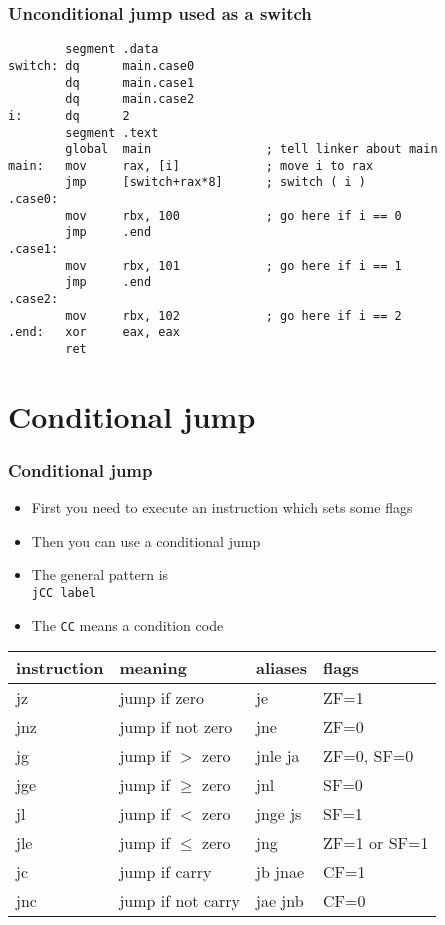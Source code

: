 \documentclass{beamer}
\begin{document}
\begin{frame}[fragile]
    \frametitle{Unconditional jump used as a switch}
\small
\begin{verbatim}
        segment .data
switch: dq      main.case0
        dq      main.case1
        dq      main.case2
i:      dq      2
        segment .text
        global  main                ; tell linker about main
main:   mov     rax, [i]            ; move i to rax
        jmp     [switch+rax*8]      ; switch ( i )
.case0:
        mov     rbx, 100            ; go here if i == 0
        jmp     .end
.case1:
        mov     rbx, 101            ; go here if i == 1
        jmp     .end     
.case2:
        mov     rbx, 102            ; go here if i == 2
.end:   xor     eax, eax
        ret
\end{verbatim}
\end{frame}

\section{Conditional jump}

\begin{frame}[fragile]
    \frametitle{Conditional jump}
    \begin{itemize}
        \item First you need to execute an instruction which sets some flags
        \item Then you can use a conditional jump
        \item The general pattern is \\
    {\tt jCC    label}
        \item The {\tt CC} means a condition code
    \end{itemize}
\begin{center}
  \begin{tabular}{|l|l|l|l|}
    \hline
    instruction & meaning & aliases & flags \\
    \hline
    jz   & jump if zero & je & ZF=1 \\
    \hline
    jnz  & jump if not zero & jne & ZF=0 \\
    \hline
    jg   & jump if $>$ zero & jnle ja & ZF=0, SF=0 \\
    \hline
    jge  & jump if $\ge$ zero & jnl & SF=0 \\
    \hline
    jl   & jump if $<$ zero & jnge js & SF=1 \\
    \hline
    jle  & jump if $\le$ zero & jng & ZF=1 or SF=1 \\
    \hline
    jc   & jump if carry & jb jnae & CF=1 \\
    \hline
    jnc  & jump if not carry & jae jnb & CF=0 \\
    \hline
  \end{tabular}
\end{center}
\end{frame}
\end{document}
